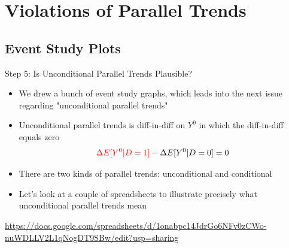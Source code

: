 \documentclass{beamer}
\begin{document}







\section{Violations of Parallel Trends}

\subsection{Event Study Plots}
\begin{frame}{Step 5: Is Unconditional Parallel Trends Plausible?}

\begin{itemize}
\item We drew a bunch of event study graphs, which leads into the next issue regarding "unconditional parallel trends"
\item Unconditional parallel trends is diff-in-diff on $Y^0$ in which the diff-in-diff equals zero
	$$\textcolor{red}{\Delta E[Y^0|D=1]} - \Delta E[Y^0|D=0] = 0$$ 
\item There are two kinds of parallel trends: unconditional and conditional
\item Let's look at a couple of spreadsheets to illustrate precisely what unconditional parallel trends mean
\end{itemize}

\bigskip 

\url{https://docs.google.com/spreadsheets/d/1onabpc14JdrGo6NFv0zCWo-nuWDLLV2L1qNogDT9SBw/edit?usp=sharing}

\end{frame}
\end{document}
